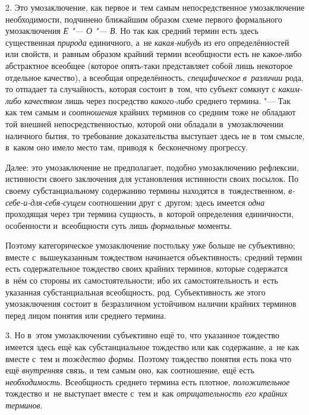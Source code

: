 2. Это умозаключение, как первое и~тем самым непосредственное
умозаключение необходимости, подчинено ближайшим образом схеме первого
формального умозаключения {\em Е "--- О "--- В}. Но так как средний
термин есть здесь существенная
{\em природа} единичного,
а~не {\em какая-нибудь}
из его определённостей или свойств, и~равным образом крайний
термин всеобщности есть не какое-либо абстрактное всеобщее (которое
опять-таки представляет собой лишь некоторое отдельное качество), а
всеобщая определённость,
{\em специфическое в~различии}
рода, то отпадает та случайность, которая состоит в~том, что
субъект сомкнут с {\em каким-либо
качеством} лишь через посредство
{\em какого-либо}
среднего термина. "--- Так как тем самым и
{\em соотношения} крайних
терминов со средним тоже не обладают той внешней непосредственностью,
которой они обладали в~умозаключении наличного бытия, то требование
доказательства выступает здесь не в~том смысле, в~каком оно
имело место там, приводя к~бесконечному прогрессу.

Далее: это умозаключение не предполагает, подобно
умозаключению рефлексии, истинности своего заключения для установления
истинности своих посылок. По своему субстанциальному содержанию термины
находятся в~тождественном,
{\em в-себе-и-для-себя-сущем}
соотношении друг с~другом; здесь имеется
{\em одна} проходящая
через три термина сущность, в~которой определения единичности, особенности
и~всеобщности суть лишь
{\em формальные}
моменты.

Поэтому категорическое умозаключение постольку уже больше не
субъективно; вместе с~вышеуказанным тождеством начинается объективность;
средний термин есть содержательное тождество своих крайних терминов,
которые содержатся в~нём со стороны их самостоятельности; ибо их
самостоятельность и~есть указанная субстанциальная всеобщность, род.
Субъективность же этого умозаключения состоит в~безразличном устойчивом
наличии крайних терминов перед лицом понятия или среднего термина.

3. Но в~этом умозаключении субъективно ещё то, что указанное
тождество имеется здесь ещё как субстанциальное тождество или как
содержание, а~не как вместе с~тем и
{\em тождество формы}.
Поэтому тождество понятия есть пока что ещё
{\em внутренняя} связь, и
тем самым оно, как соотношение, ещё есть
{\em необходимость}.
Всеобщность среднего термина есть плотное,
{\em положительное}
тождество и~не выступает вместе с~тем и~как
{\em отрицательность его крайних
терминов}.

